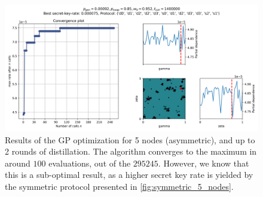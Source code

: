 \documentclass{article}
\begin{document}
\begin{figure}[ht!]
  \centering
  \includegraphics[width=\linewidth]{asymmetric/old_protocol_space/results_gp_tcoh1400000_pgen0.00092_pswap0.85_w00.952_nodes5_maxdists2/skopt_gp.png}
  \caption{Results of the GP optimization for 5 nodes (asymmetric), and up to 2 rounds of distillation. The algorithm converges to the maximum in around $100$ evaluations, out of the $295245$. However, we know that this is a sub-optimal result, as a higher secret key rate is yielded by the symmetric protocol presented in \ref{fig:symmetric_5_nodes}.}
  \label{fig:asymmetric_5_nodes}
\end{figure}
\end{document}
